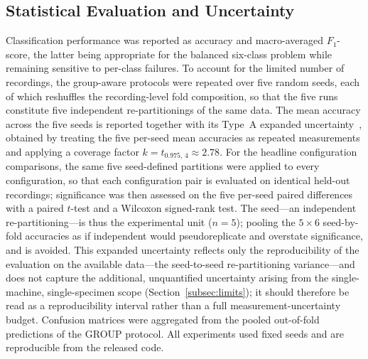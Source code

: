\subsection{Statistical Evaluation and Uncertainty}
Classification performance was reported as accuracy and macro-averaged
$F_1$-score, the latter being appropriate for the balanced six-class problem while
remaining sensitive to per-class failures. To account for the limited number of
recordings, the group-aware protocols were repeated over five random seeds, each
of which reshuffles the recording-level fold composition, so that the five runs
constitute five independent re-partitionings of the same data. The mean accuracy
across the five seeds is reported together with its Type~A expanded
uncertainty~\cite{jcgm2008gum}, obtained by treating the five per-seed mean
accuracies as repeated measurements and applying a coverage factor
$k=t_{0.975,\,4}\approx2.78$. For the headline configuration comparisons, the
same five seed-defined partitions were applied to every configuration, so that
each configuration pair is evaluated on identical held-out recordings;
significance was then assessed on the five per-seed paired differences with a
paired $t$-test and a Wilcoxon signed-rank test. The seed---an independent
re-partitioning---is thus the experimental unit ($n=5$); pooling the $5\times6$
seed-by-fold accuracies as if independent would pseudoreplicate and overstate
significance, and is avoided. This expanded uncertainty reflects only the
reproducibility of the evaluation on the available data---the seed-to-seed
re-partitioning variance---and does not capture the additional, unquantified
uncertainty arising from the single-machine, single-specimen scope
(Section~\ref{subsec:limits}); it should therefore be read as a reproducibility
interval rather than a full measurement-uncertainty budget. Confusion matrices
were aggregated from the pooled out-of-fold predictions of the GROUP protocol.
All experiments used fixed seeds and are reproducible from the released code.

